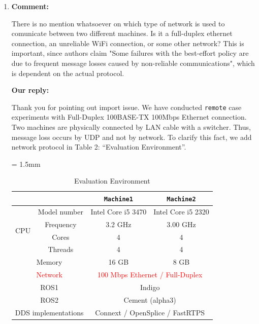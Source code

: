 \documentclass{article}
\begin{document}
\begin{enumerate}
\item \begin{flushleft}
    \textbf{Comment:}
  \end{flushleft}
  There is no mention whatsoever on which type of network is used to comunicate between two different machines. Is it a full-duplex ethernet connection, an unreliable WiFi connection, or some other network?
  This is important, since authors claim "Some failures with the best-effort policy are due to frequent message losses caused by non-reliable communications", which is dependent on the actual protocol.

  \begin{flushleft}
    \textbf{Our reply:}
  \end{flushleft}
  Thank you for pointing out import issue. 
  We have conducted \texttt{remote} case experiments with Full-Duplex 100BASE-TX 100Mbps Ethernet connection.
  Two machines are physically connected by LAN cable with a switcher.
  Thus, message loss occurs by UDP and not by network.
  To clarify this fact, we add network protocol in Table 2: ``Evaluation Environment''.
  \setcounter{table}{1}
  \begin{table}[h]
    \caption{Evaluation Environment}
    \centering
    \begin{threeparttable}
      \renewcommand{\arraystretch}{1.0}
      \label{tb:environment}
      \small
      \tabcolsep = 1.5mm              %
      \begin{tabular}{c|c||c|c}
        \hline
        \multicolumn{2}{c||}{ } & \textbf{\texttt{Machine1}} & \textbf{\texttt{Machine2}} \\ \hline \hline
        \multirow{4}{*}{CPU}   & Model number & Intel Core i5 3470 & Intel Core i5 2320 \\ 
        & Frequency & 3.2 GHz & 3.00 GHz \\ 
        & Cores & 4 & 4 \\ 
        & Threads & 4 & 4 \\ \hline
        \multicolumn{2}{c||}{Memory} & 16 GB & 8 GB \\ \hline 
        \multicolumn{2}{c||}{\textcolor{red}{Network}} & \multicolumn{2}{c}{\textcolor{red}{100 Mbps Ethernet / Full-Duplex}} \\ \hline
        \multicolumn{2}{c||}{ROS1} & \multicolumn{2}{c}{Indigo} \\ 
        \multicolumn{2}{c||}{ROS2} & \multicolumn{2}{c}{Cement (alpha3)} \\ 
        \multicolumn{2}{c||}{DDS implementations} & \multicolumn{2}{c}{Connext\tnote{1} / OpenSplice\tnote{2} / FastRTPS } \\ \hline 

\end{tabular}
\end{threeparttable}
\end{table}
\end{enumerate}
\end{document}
